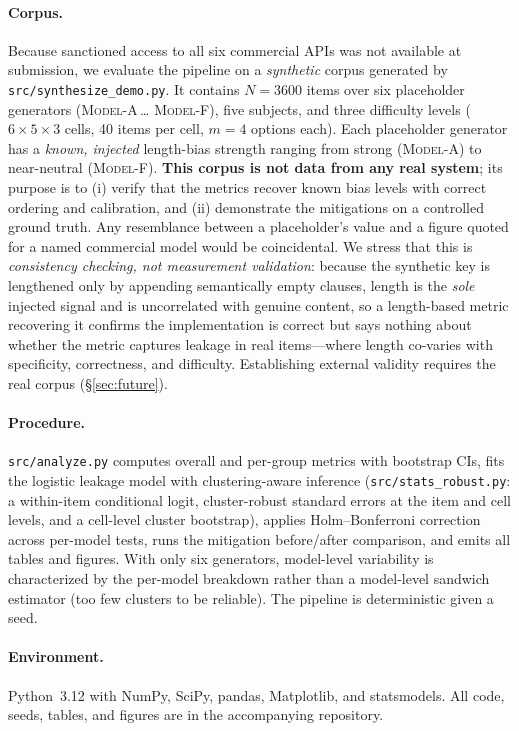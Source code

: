 \documentclass[10pt,twocolumn]{article}
\begin{document}
\paragraph{Corpus.} Because sanctioned access to all six commercial APIs was
not available at submission, we evaluate the pipeline on a \emph{synthetic}
corpus generated by \texttt{src/synthesize\_demo.py}. It contains
$N=3600$ items over six placeholder generators (\textsc{Model-A}\,\dots
\textsc{Model-F}), five subjects, and three difficulty levels
($6\times5\times3$ cells, 40 items per cell, $m=4$ options each). Each
placeholder generator has a \emph{known, injected} length-bias strength
ranging from strong (\textsc{Model-A}) to near-neutral (\textsc{Model-F}).
\textbf{This corpus is not data from any real system}; its purpose is to (i)
verify that the metrics recover known bias levels with correct ordering and
calibration, and (ii) demonstrate the mitigations on a controlled ground
truth. Any resemblance between a placeholder's value and a figure quoted for a
named commercial model would be coincidental. We stress that this is
\emph{consistency checking, not measurement validation}: because the synthetic
key is lengthened only by appending semantically empty clauses, length is the
\emph{sole} injected signal and is uncorrelated with genuine content, so a
length-based metric recovering it confirms the implementation is correct but says
nothing about whether the metric captures leakage in real items---where length
co-varies with specificity, correctness, and difficulty. Establishing external
validity requires the real corpus (\S\ref{sec:future}).

\paragraph{Procedure.} \texttt{src/analyze.py} computes overall and per-group
metrics with bootstrap CIs, fits the logistic leakage model with
clustering-aware inference (\texttt{src/stats\_robust.py}: a within-item
conditional logit, cluster-robust standard errors at the item and cell levels,
and a cell-level cluster bootstrap), applies Holm--Bonferroni correction across
per-model tests, runs the mitigation before/after comparison, and emits all
tables and figures. With only six generators, model-level variability is
characterized by the per-model breakdown rather than a model-level sandwich
estimator (too few clusters to be reliable). The pipeline is deterministic given
a seed.

\paragraph{Environment.} Python~3.12 with NumPy, SciPy, pandas, Matplotlib, and
statsmodels. All code, seeds, tables, and figures are in the accompanying
repository.
\end{document}
